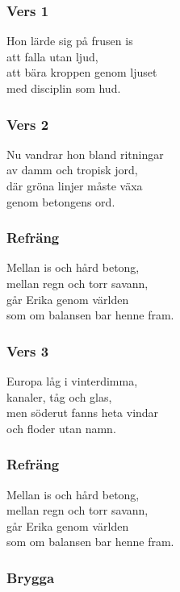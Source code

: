 \documentclass[]{article}
\begin{document}
\subsubsection{Vers 1}\label{vers-1}

Hon lärde sig på frusen is\\
att falla utan ljud,\\
att bära kroppen genom ljuset\\
med disciplin som hud.

\subsubsection{Vers 2}\label{vers-2}

Nu vandrar hon bland ritningar\\
av damm och tropisk jord,\\
där gröna linjer måste växa\\
genom betongens ord.

\subsubsection{Refräng}\label{refruxe4ng}

Mellan is och hård betong,\\
mellan regn och torr savann,\\
går Erika genom världen\\
som om balansen bar henne fram.

\subsubsection{Vers 3}\label{vers-3}

Europa låg i vinterdimma,\\
kanaler, tåg och glas,\\
men söderut fanns heta vindar\\
och floder utan namn.

\subsubsection{Refräng}\label{refruxe4ng-1}

Mellan is och hård betong,\\
mellan regn och torr savann,\\
går Erika genom världen\\
som om balansen bar henne fram.

\subsubsection{Brygga}\label{brygga}
\end{document}

